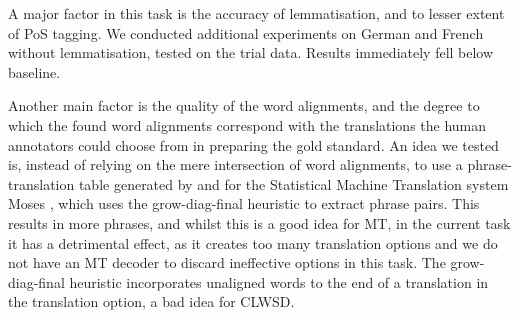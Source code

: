 \begin{table}[tbh]
\footnotesize
\noindent{}
\caption{Results on the test set}
\label{tabfinal}
\end{table}

A major factor in this task is the accuracy of lemmatisation, and to lesser
extent of PoS tagging. We conducted additional experiments on German and French
without lemmatisation, tested on the trial data. Results immediately fell below
baseline. 

Another main factor is the quality of the word alignments, and the degree to
which the found word alignments correspond with the translations the human
annotators could choose from in preparing the gold standard. An idea we tested
is, instead of relying on the mere intersection of word alignments, to use a
phrase-translation table generated by and for the Statistical Machine
Translation system Moses \citep{Koehn+07}, which uses the grow-diag-final
heuristic to extract phrase pairs. This results in more phrases, and whilst
this is a good idea for MT, in the current task it has a detrimental effect, as
it creates too many translation options and we do not have an MT decoder to
discard ineffective options in this task. The grow-diag-final heuristic
incorporates unaligned words to the end of a translation in the translation
option, a bad idea for CLWSD.



